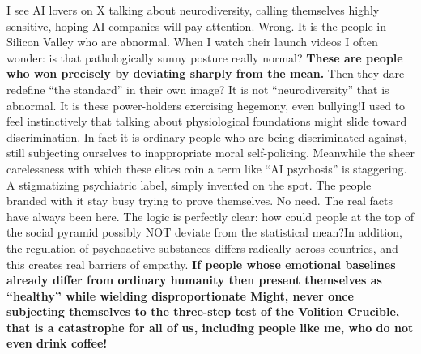 \documentclass[11pt]{article}
\renewcommand{\\}[1][\mynewlineskip]{\oldnewline[#1]}
\begin{document}
I see AI lovers on X talking about neurodiversity, calling themselves highly sensitive, hoping AI companies will pay attention. Wrong. It is the people in Silicon Valley who are abnormal. When I watch their launch videos I often wonder: is that pathologically sunny posture really normal? \textbf{These are people who won precisely by deviating sharply from the mean.} Then they dare redefine ``the standard'' in their own image? It is not ``neurodiversity'' that is abnormal. It is these power-holders exercising hegemony, even bullying!\\
I used to feel instinctively that talking about physiological foundations might slide toward discrimination. In fact it is ordinary people who are being discriminated against, still subjecting ourselves to inappropriate moral self-policing. Meanwhile the sheer carelessness with which these elites coin a term like ``AI psychosis'' is staggering. A stigmatizing psychiatric label, simply invented on the spot. The people branded with it stay busy trying to prove themselves. No need. The real facts have always been here. The logic is perfectly clear: how could people at the top of the social pyramid possibly NOT deviate from the statistical mean?\\
In addition, the regulation of psychoactive substances differs radically across countries, and this creates real barriers of empathy. \textbf{If people whose emotional baselines already differ from ordinary humanity then present themselves as ``healthy'' while wielding disproportionate Might, never once subjecting themselves to the three-step test of the Volition Crucible, that is a catastrophe for all of us, including people like me, who do not even drink coffee!}
\end{document}
